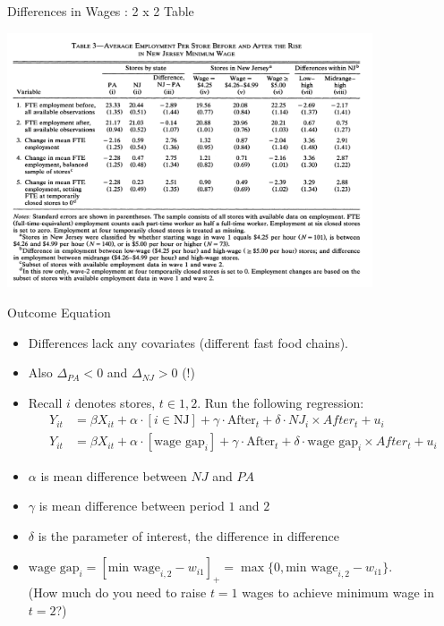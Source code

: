 \begin{frame}{Differences in Wages : 2 x 2 Table}
\begin{center}
\includegraphics[width=4.25in]{./resources/ck_tab3.png}
\end{center}
\end{frame}

\begin{frame}{Outcome Equation}
\begin{itemize}
\item Differences lack any covariates (different fast food chains).
\item Also $\Delta_{PA}<0$ and $\Delta_{NJ} > 0$ (!)
\item Recall $i$ denotes stores, $t \in {1,2}$. Run the following regression:
\begin{align*}
Y_{it}&=\beta X_{it} +\alpha \cdot [i \in \text{NJ}] +  \gamma \cdot \text{After}_{t}  + \delta \cdot NJ_i \times After_{t} +u_{i}\\
Y_{it}&=\beta X_{it} +\alpha \cdot [\text{wage gap}_{i}] +  \gamma \cdot \text{After}_{t}  + \delta \cdot \text{wage gap}_{i} \times After_{t} +u_{i}
\end{align*}
\item $\alpha$ is mean difference between $NJ$ and $PA$
\item $\gamma$ is mean difference between period $1$ and $2$
\item $\delta$ is the parameter of interest, the \alert{difference in difference}
\item $\text{wage gap}_{i} = [\text{min wage}_{i,2}-w_{i1} ]_{+} =\max\{0, \text{min wage}_{i,2}-w_{i1}\} $.\\
 (How much do you need to raise $t=1$ wages to achieve minimum wage in $t=2$?)
\end{itemize}
\end{frame}

